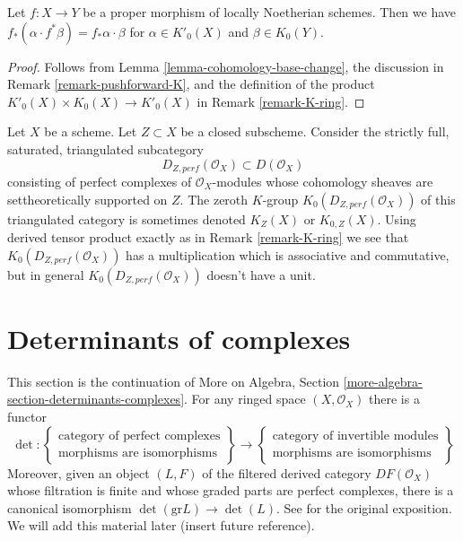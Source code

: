 \begin{lemma}
\label{lemma-projection-formula}
Let $f : X \to Y$ be a proper morphism of locally Noetherian schemes.
Then we have $f_*(\alpha \cdot f^*\beta) = f_*\alpha \cdot \beta$
for $\alpha \in K'_0(X)$ and $\beta \in K_0(Y)$.
\end{lemma}

\begin{proof}
Follows from Lemma \ref{lemma-cohomology-base-change}, the discussion in
Remark \ref{remark-pushforward-K}, and the definition of the product
$K'_0(X) \times K_0(X) \to K'_0(X)$ in Remark \ref{remark-K-ring}.
\end{proof}

\begin{remark}
\label{remark-perf-Z}
Let $X$ be a scheme. Let $Z \subset X$ be a closed subscheme. Consider the
strictly full, saturated, triangulated subcategory
$$
D_{Z, perf}(\mathcal{O}_X) \subset D(\mathcal{O}_X)
$$
consisting of perfect complexes of $\mathcal{O}_X$-modules
whose cohomology sheaves are settheoretically supported on $Z$.
The zeroth $K$-group $K_0(D_{Z, perf}(\mathcal{O}_X))$
of this triangulated category is sometimes denoted
$K_Z(X)$ or $K_{0, Z}(X)$. Using derived tensor product exactly
as in Remark \ref{remark-K-ring} we see that $K_0(D_{Z, perf}(\mathcal{O}_X))$
has a multiplication which is associative and commutative,
but in general $K_0(D_{Z, perf}(\mathcal{O}_X))$ doesn't have a unit.
\end{remark}













\section{Determinants of complexes}
\label{section-det-two-terms}

\noindent
This section is the continuation of
More on Algebra, Section \ref{more-algebra-section-determinants-complexes}.
For any ringed space $(X, \mathcal{O}_X)$ there is a functor
$$
\det :
\left\{
\begin{matrix}
\text{category of perfect complexes} \\
\text{morphisms are isomorphisms}
\end{matrix}
\right\}
\longrightarrow
\left\{
\begin{matrix}
\text{category of invertible modules} \\
\text{morphisms are isomorphisms}
\end{matrix}
\right\}
$$
Moreover, given an object $(L, F)$ of the filtered derived category
$DF(\mathcal{O}_X)$ whose filtration is finite and whose graded parts
are perfect complexes, there is a canonical isomorphism
$\det(\text{gr}L) \to \det(L)$. See \cite{determinant} for the
original exposition. We will add this material later (insert future reference).

